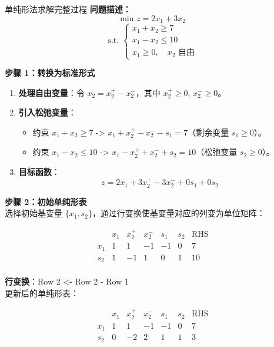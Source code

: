     \begin{exbox}{单纯形法求解完整过程}{}
        \textbf{问题描述：}
        \[
        \text{min } z = 2x_1 + 3x_2
        \]
        \[
        \text{s.t. }
        \begin{cases}
        x_1 + x_2 \geq 7 \\
        x_1 - x_2 \leq 10 \\
        x_1 \geq 0, \quad x_2 \text{ 自由}
        \end{cases}
        \]
        
        \textbf{步骤 1：转换为标准形式}
        \begin{enumerate}
          \item \textbf{处理自由变量}：令 \( x_2 = x_2^+ - x_2^- \)，其中 \( x_2^+ \geq 0 \), \( x_2^- \geq 0 \)。
          \item \textbf{引入松弛变量}：
            \begin{itemize}
              \item 约束 \( x_1 + x_2 \geq 7 \) -> \( x_1 + x_2^+ - x_2^- - s_1 = 7 \)（剩余变量 \( s_1 \geq 0 \)）。
              \item 约束 \( x_1 - x_2 \leq 10 \) -> \( x_1 - x_2^+ + x_2^- + s_2 = 10 \)（松弛变量 \( s_2 \geq 0 \)）。
            \end{itemize}
          \item \textbf{目标函数}：
            \[
            z = 2x_1 + 3x_2^+ - 3x_2^- + 0s_1 + 0s_2
            \]
        \end{enumerate}
        
        \textbf{步骤 2：初始单纯形表}\\
        选择初始基变量 \( \{x_1, s_2\} \)，通过行变换使基变量对应的列变为单位矩阵：
        
        \[
        \begin{array}{cccccc|c}
         & x_1 & x_2^+ & x_2^- & s_1 & s_2 & \text{RHS} \\
        \hline
        x_1 & 1 & 1 & -1 & -1 & 0 & 7 \\
        s_2 & 1 & -1 & 1 & 0 & 1 & 10 \\
        \end{array}
        \]
        
        \textbf{行变换}：Row 2 <- Row 2 - Row 1\\
        更新后的单纯形表：
        
        \[
        \begin{array}{cccccc|c}
         & x_1 & x_2^+ & x_2^- & s_1 & s_2 & \text{RHS} \\
        \hline
        x_1 & 1 & 1 & -1 & -1 & 0 & 7 \\
        s_2 & 0 & -2 & 2 & 1 & 1 & 3 \\
        \end{array}
        \]
        

\end{exbox}
